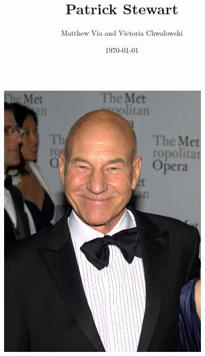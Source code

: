 \documentclass[xcolor=dvipsnames]{beamer}
\begin{document}
\author{Matthew Via and Victoria Chwalowski}
\title{Patrick Stewart}
\date{\today}
\newtheorem{fct}{Fact}
\newtheorem{qct}{Quote}
\begin{frame}{}
  \begin{columns}
    \begin{column}{0.5\textwidth}
      \titlepage
    \end{column}
    \begin{column}{0.5\textwidth}
      \begin{center}
        \includegraphics[width=0.8\textwidth]{smile.jpg}
      \end{center}
    \end{column}
  \end{columns}
\end{frame}
\end{document}
